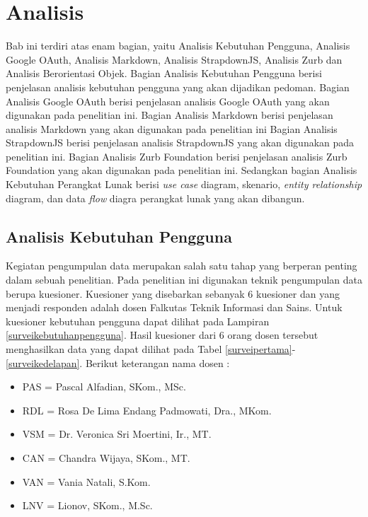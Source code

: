 \chapter{Analisis}
\label{chap:analisis}

Bab ini terdiri atas enam bagian, yaitu Analisis Kebutuhan Pengguna, Analisis Google OAuth, Analisis Markdown, Analisis StrapdownJS, Analisis Zurb dan Analisis Berorientasi Objek. Bagian Analisis Kebutuhan Pengguna berisi penjelasan analisis kebutuhan pengguna yang akan dijadikan pedoman. Bagian Analisis Google OAuth berisi penjelasan analisis Google OAuth yang akan digunakan pada penelitian ini. Bagian Analisis Markdown berisi penjelasan analisis Markdown yang akan digunakan pada penelitian ini Bagian Analisis StrapdownJS berisi penjelasan analisis StrapdownJS yang akan digunakan pada penelitian ini. Bagian Analisis Zurb Foundation berisi penjelasan analisis Zurb Foundation yang akan digunakan pada penelitian ini. Sedangkan bagian Analisis Kebutuhan Perangkat Lunak berisi {\it use case} diagram, skenario, {\it entity relationship} diagram, dan data {\it flow} diagra perangkat lunak yang akan dibangun.

\section{Analisis Kebutuhan Pengguna}
\label{sec:analisiskebutuhanpengguna}
Kegiatan pengumpulan data merupakan salah satu tahap yang berperan penting dalam sebuah penelitian. Pada penelitian ini digunakan teknik pengumpulan data berupa kuesioner. Kuesioner yang disebarkan sebanyak 6 kuesioner dan yang menjadi responden adalah dosen Falkutas Teknik Informasi dan Sains. Untuk kuesioner kebutuhan pengguna dapat dilihat pada Lampiran \ref{surveikebutuhanpengguna}. Hasil kuesioner dari 6 orang dosen tersebut menghasilkan data yang dapat dilihat pada Tabel \ref{surveipertama}-\ref{surveikedelapan}. Berikut keterangan nama dosen :
\begin{itemize}
\item PAS = Pascal Alfadian, SKom., MSc.
\item RDL = Rosa De Lima Endang Padmowati, Dra., MKom.
\item VSM = Dr. Veronica Sri Moertini, Ir., MT.
\item CAN = Chandra Wijaya, SKom., MT.
\item VAN = Vania Natali, S.Kom.
\item LNV = Lionov, SKom., M.Sc.
\end{itemize}

